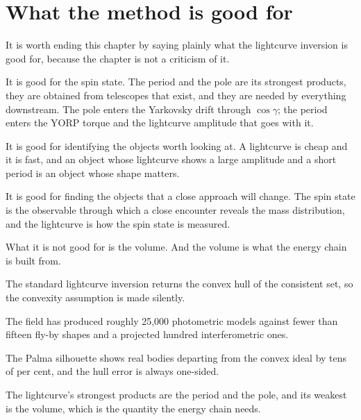 \section{What the method is good for}

It is worth ending this chapter by saying plainly what the lightcurve
inversion is good for, because the chapter is not a criticism of it.

It is good for the spin state. The period and the pole are its strongest
products, they are obtained from telescopes that exist, and they are needed
by everything downstream. The pole enters the Yarkovsky drift through
\(\cos\gamma\); the period enters the YORP torque and the lightcurve
amplitude that goes with it.

It is good for identifying the objects worth looking at. A lightcurve is
cheap and it is fast, and an object whose lightcurve shows a large amplitude
and a short period is an object whose shape matters.

It is good for finding the objects that a close approach will change. The
spin state is the observable through which a close encounter reveals the
mass distribution, and the lightcurve is how the spin state is measured.

What it is not good for is the volume. And the volume is what the energy
chain is built from.

\begin{keytakeaways}
\item The standard lightcurve inversion returns the convex hull of the
consistent set, so the convexity assumption is made silently.
\item The field has produced roughly 25,000 photometric models against fewer
than fifteen fly-by shapes and a projected hundred interferometric ones.
\item The Palma silhouette shows real bodies departing from the convex ideal
by tens of per cent, and the hull error is always one-sided.
\item The lightcurve's strongest products are the period and the pole, and
its weakest is the volume, which is the quantity the energy chain needs.
\end{keytakeaways}
